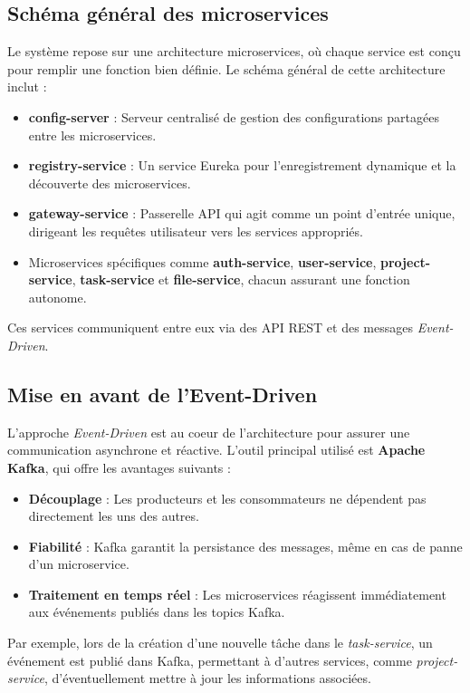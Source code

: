 \documentclass[12pt,a4paper]{report}
\begin{document}
\subsection*{Sch\'ema g\'en\'eral des microservices}
Le syst\`eme repose sur une architecture microservices, o\`u chaque service est con\c{c}u pour remplir une fonction bien d\'efinie. Le sch\'ema g\'en\'eral de cette architecture inclut :
\begin{itemize}
    \item \textbf{config-server} : Serveur centralis\'e de gestion des configurations partag\'ees entre les microservices.
    \item \textbf{registry-service} : Un service Eureka pour l'enregistrement dynamique et la d\'ecouverte des microservices.
    \item \textbf{gateway-service} : Passerelle API qui agit comme un point d'entr\'ee unique, dirigeant les requ\^etes utilisateur vers les services appropri\'es.
    \item Microservices sp\'ecifiques comme \textbf{auth-service}, \textbf{user-service}, \textbf{project-service}, \textbf{task-service} et \textbf{file-service}, chacun assurant une fonction autonome.
\end{itemize}
Ces services communiquent entre eux via des API REST et des messages \textit{Event-Driven}.

\subsection*{Mise en avant de l’Event-Driven}
L'approche \textit{Event-Driven} est au coeur de l'architecture pour assurer une communication asynchrone et r\'eactive. L'outil principal utilis\'e est \textbf{Apache Kafka}, qui offre les avantages suivants :
\begin{itemize}
    \item \textbf{D\'ecouplage} : Les producteurs et les consommateurs ne d\'ependent pas directement les uns des autres.
    \item \textbf{Fiabilit\'e} : Kafka garantit la persistance des messages, m\^eme en cas de panne d'un microservice.
    \item \textbf{Traitement en temps r\'eel} : Les microservices r\'eagissent imm\'ediatement aux \'ev\'enements publi\'es dans les topics Kafka.
\end{itemize}
Par exemple, lors de la cr\'eation d'une nouvelle t\^ache dans le \textit{task-service}, un \'ev\'enement est publi\'e dans Kafka, permettant \`a d'autres services, comme \textit{project-service}, d'éventuellement mettre \`a jour les informations associ\'ees.
\end{document}

